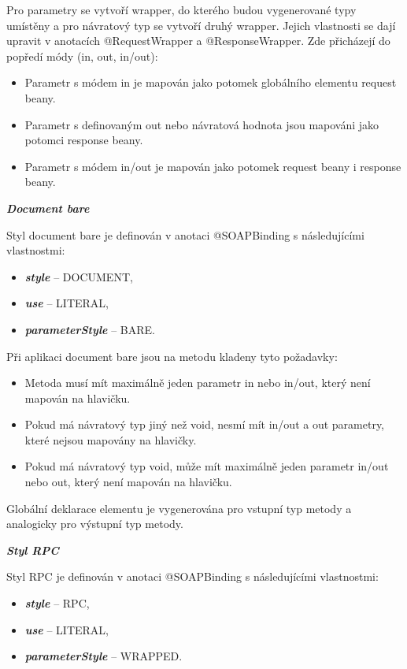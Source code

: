 \documentclass[11pt,twoside,a4paper]{book}
\begin{document}
Pro parametry se vytvoří wrapper, do kterého budou vygenerované typy umístěny a pro
návratový typ se vytvoří druhý wrapper. Jejich vlastnosti se dají upravit v anotacích
@RequestWrapper a @ResponseWrapper. Zde přicházejí do popředí módy (in, out, in/out):

\begin{itemize}
  \item Parametr s módem in je mapován jako potomek globálního elementu request beany.
  \item Parametr s definovaným out nebo návratová hodnota jsou mapováni jako potomci
response beany.
  \item Parametr s módem in/out je mapován jako potomek request beany i response beany.
\end{itemize}

\textbf{\textit{Document bare}}

Styl document bare je definován v anotaci @SOAPBinding s následujícími vlastnostmi:

\begin{itemize}
  \item \textbf{\textit{style}} – DOCUMENT,
  \item \textbf{\textit{use}} – LITERAL,
  \item \textbf{\textit{parameterStyle}} – BARE.
\end{itemize}

Při aplikaci document bare jsou na metodu kladeny tyto požadavky:

\begin{itemize}
  \item Metoda musí mít maximálně jeden parametr in nebo in/out, který není mapován na
hlavičku.
  \item Pokud má návratový typ jiný než void, nesmí mít in/out a out parametry, které nejsou
mapovány na hlavičky.
  \item Pokud má návratový typ void, může mít maximálně jeden parametr in/out
nebo out, který není mapován na hlavičku.
\end{itemize}

Globální deklarace elementu je vygenerována pro vstupní typ metody a analogicky pro
výstupní typ metody.

\textbf{\textit{Styl RPC}}

Styl RPC je definován v anotaci @SOAPBinding s následujícími vlastnostmi:

\begin{itemize}
  \item \textbf{\textit{style}} – RPC,
  \item \textbf{\textit{use}} – LITERAL,
  \item \textbf{\textit{parameterStyle}} – WRAPPED.
\end{itemize}
\end{document}
